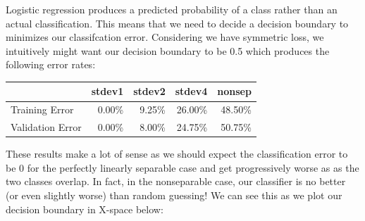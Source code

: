 \documentclass[10pt]{article}
\begin{document}
Logistic regression produces a predicted probability of a class rather than an actual classification. This means that we need to decide a decision boundary to minimizes our classifcation error. Considering we have symmetric loss, we intuitively might want our decision boundary to be 0.5 which produces the following error rates:

\begin{table}[ht]
\centering
{}
\begin{tabular}{lrrrr}
\toprule
{} & stdev1 & stdev2 & stdev4 & nonsep\\
\midrule
  Training Error   & 0.00\%  & 9.25\% &  26.00\% & 48.50\% \\
  Validation Error & 0.00\%  & 8.00\% &  24.75\% & 50.75\% \\
\bottomrule
\end{tabular}
\end{table}


These results make a lot of sense as we should expect the classification error to be 0 for the perfectly linearly separable case and get progressively worse as as the two classes overlap. In fact, in the nonseparable case, our classifier is no better (or even slightly worse) than random guessing! We can see this as we plot our decision boundary in X-space below:
\end{document}
